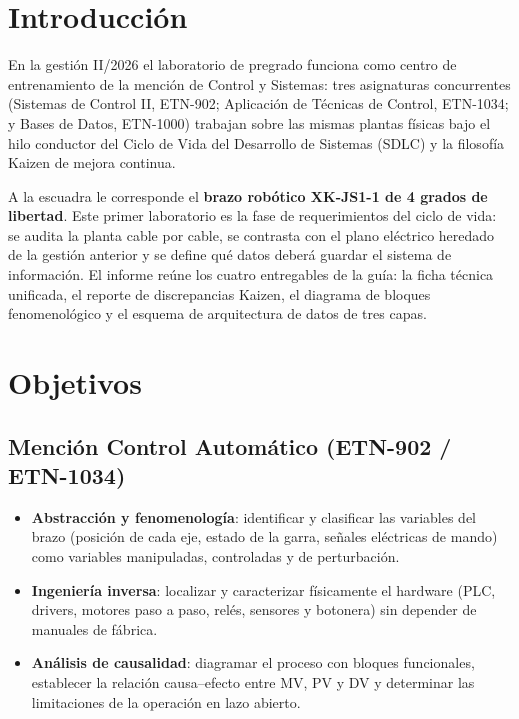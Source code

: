 \documentclass[a4paper,11pt]{article}
\begin{document}

\tableofcontents
\newpage

\section{Introducción}
En la gestión II/2026 el laboratorio de pregrado funciona como centro de entrenamiento de la mención de Control y Sistemas: tres asignaturas concurrentes (Sistemas de Control II, ETN-902; Aplicación de Técnicas de Control, ETN-1034; y Bases de Datos, ETN-1000) trabajan sobre las mismas plantas físicas bajo el hilo conductor del Ciclo de Vida del Desarrollo de Sistemas (SDLC) y la filosofía Kaizen de mejora continua.

A la escuadra le corresponde el \textbf{brazo robótico XK-JS1-1 de 4 grados de libertad}. Este primer laboratorio es la fase de requerimientos del ciclo de vida: se audita la planta cable por cable, se contrasta con el plano eléctrico heredado de la gestión anterior y se define qué datos deberá guardar el sistema de información. El informe reúne los cuatro entregables de la guía: la ficha técnica unificada, el reporte de discrepancias Kaizen, el diagrama de bloques fenomenológico y el esquema de arquitectura de datos de tres capas.

\section{Objetivos}
\subsection{Mención Control Automático (ETN-902 / ETN-1034)}
\begin{itemize}
\item \textbf{Abstracción y fenomenología}: identificar y clasificar las variables del brazo (posición de cada eje, estado de la garra, señales eléctricas de mando) como variables manipuladas, controladas y de perturbación.
\item \textbf{Ingeniería inversa}: localizar y caracterizar físicamente el hardware (PLC, drivers, motores paso a paso, relés, sensores y botonera) sin depender de manuales de fábrica.
\item \textbf{Análisis de causalidad}: diagramar el proceso con bloques funcionales, establecer la relación causa--efecto entre MV, PV y DV y determinar las limitaciones de la operación en lazo abierto.
\end{itemize}
\end{document}
